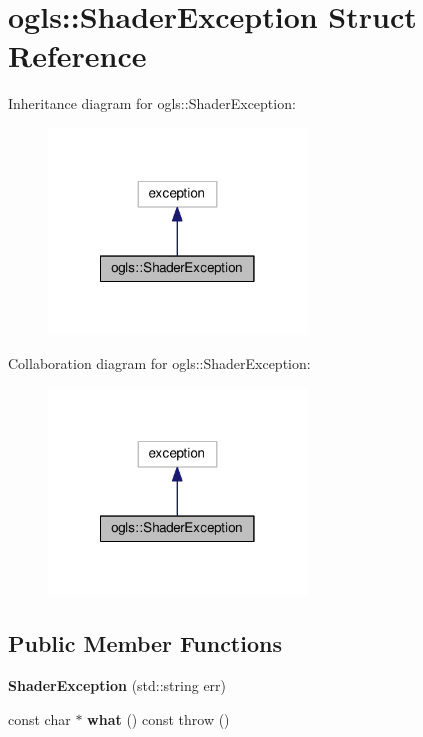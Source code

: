 \hypertarget{structogls_1_1ShaderException}{\section{ogls\-:\-:Shader\-Exception Struct Reference}
\label{structogls_1_1ShaderException}
}


Inheritance diagram for ogls\-:\-:Shader\-Exception\-:
\nopagebreak
\begin{figure}[H]
\begin{center}
\leavevmode
\includegraphics[width=194pt]{d5/dc9/structogls_1_1ShaderException__inherit__graph}
\end{center}
\end{figure}


Collaboration diagram for ogls\-:\-:Shader\-Exception\-:
\nopagebreak
\begin{figure}[H]
\begin{center}
\leavevmode
\includegraphics[width=194pt]{d1/df5/structogls_1_1ShaderException__coll__graph}
\end{center}
\end{figure}
\subsection*{Public Member Functions}
\begin{DoxyCompactItemize}
\item 
\hypertarget{structogls_1_1ShaderException_a0201786b9f03cf8d8c3314b6eb5fbee4}{{\bfseries Shader\-Exception} (std\-::string err)}\label{structogls_1_1ShaderException_a0201786b9f03cf8d8c3314b6eb5fbee4}

\item 
\hypertarget{structogls_1_1ShaderException_a021ae822f6a2d0e5105c4f9038275cf0}{const char $\ast$ {\bfseries what} () const   throw ()}\label{structogls_1_1ShaderException_a021ae822f6a2d0e5105c4f9038275cf0}

\end{DoxyCompactItemize}
